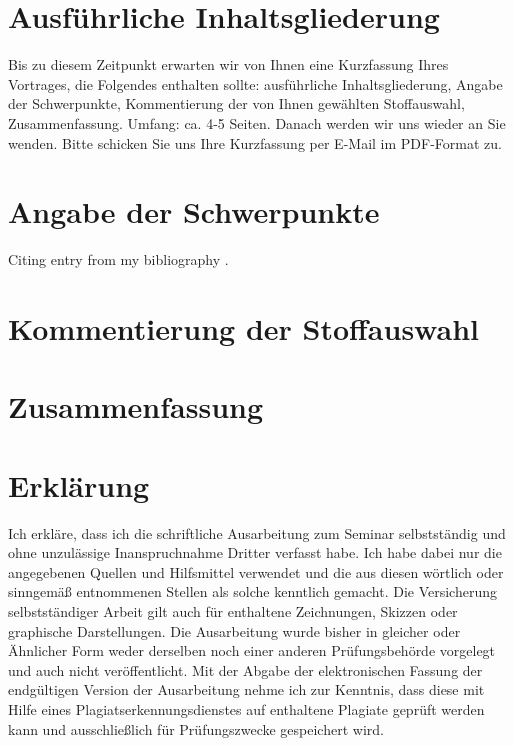 \documentclass[11pt]{article}
\begin{document}
\section{Ausführliche Inhaltsgliederung}
Bis zu diesem Zeitpunkt erwarten wir von Ihnen eine Kurzfassung Ihres Vortrages, die  Folgendes enthalten sollte: ausführliche Inhaltsgliederung, Angabe der Schwerpunkte, Kommentierung der von Ihnen gewählten Stoffauswahl, Zusammenfassung. Umfang: ca. 4-5 Seiten. Danach werden wir uns wieder an Sie wenden. Bitte schicken Sie uns Ihre Kurzfassung per E-Mail im PDF-Format zu.
\section{Angabe der Schwerpunkte}
Citing entry from my bibliography \cite{kutz_2013}.
\section{Kommentierung der Stoffauswahl}
\section{Zusammenfassung}

\newpage




\newpage

\section{Erklärung}
Ich erkläre, dass ich die schriftliche Ausarbeitung zum Seminar selbstständig und ohne unzulässige Inanspruchnahme Dritter verfasst habe. Ich habe dabei nur die angegebenen Quellen und Hilfsmittel verwendet und die aus diesen wörtlich oder sinngemäß entnommenen Stellen als solche kenntlich gemacht. Die Versicherung selbstständiger Arbeit gilt auch für enthaltene Zeichnungen, Skizzen oder graphische Darstellungen. Die Ausarbeitung wurde bisher in gleicher oder Ähnlicher Form weder derselben noch einer anderen Prüfungsbehörde vorgelegt und auch nicht veröffentlicht. Mit der Abgabe der elektronischen Fassung der endgültigen Version der Ausarbeitung nehme ich zur Kenntnis, dass diese mit Hilfe eines Plagiatserkennungsdienstes auf enthaltene Plagiate geprüft werden kann und ausschließlich für Prüfungszwecke gespeichert wird.
\end{document}
